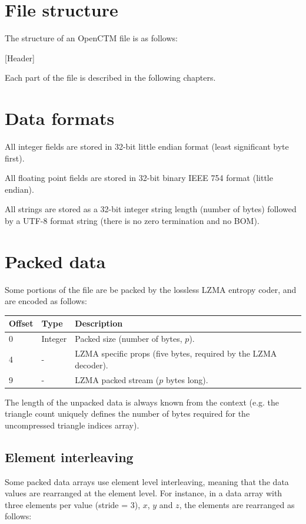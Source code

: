 \section{File structure}
The structure of an OpenCTM file is as follows:

[Header]

Each part of the file is described in the following chapters.

\section{Data formats}
All integer fields are stored in 32-bit little endian format (least significant
byte first).

All floating point fields are stored in 32-bit binary IEEE 754 format (little
endian).

All strings are stored as a 32-bit integer string length (number of bytes)
followed by a UTF-8 format string (there is no zero termination and no BOM).

\section{Packed data}
Some portions of the file are be packed by the lossless LZMA entropy coder,
and are encoded as follows:

\begin{tabular}{|l|l|l|}\hline
\textbf{Offset} & \textbf{Type} & \textbf{Description}\\ \hline
0 & Integer & Packed size (number of bytes, $p$).\\ \hline
4 & - & LZMA specific props (five bytes, required by the LZMA decoder).\\ \hline
9 & - & LZMA packed stream ($p$ bytes long).\\ \hline
\end{tabular}

The length of the unpacked data is always known from the context (e.g. the
triangle count uniquely defines the number of bytes required for the
uncompressed triangle indices array).

\subsection{Element interleaving}
Some packed data arrays use element level interleaving, meaning that the
data values are rearranged at the element level. For instance, in a data array
with three elements per value (stride = 3), $x$, $y$ and $z$, the elements are
rearranged as follows:

